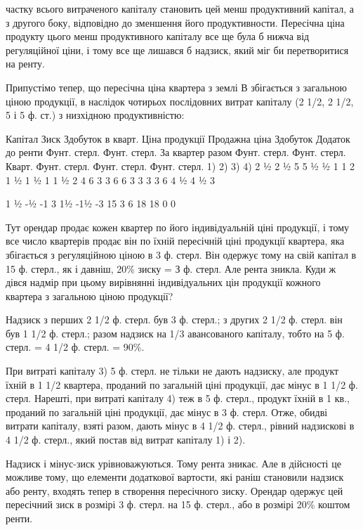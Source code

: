 \parcont{}  %
частку всього витраченого капіталу становить цей менш продуктивний капітал,
а з другого боку, відповідно до зменшення його продуктивности. Пересічна
ціна продукту цього менш продуктивного капіталу все ще була б нижча
від регуляційної ціни, і тому все ще лишався б надзиск, який міг би перетворитися
на ренту.

Припустімо тепер, що пересічна ціна квартера з землі В збігається з загальною
ціною продукції, в наслідок чотирьох послідовних витрат капіталу
(2  1/2, 2  1/2, 5 і 5 ф. ст.) з низхідною продуктивністю:

Капітал Зиск Здобуток в кварт. Ціна продукції Продажна ціна Здобуток Додаток до ренти
 Фунт. стерл. Фунт. стерл.  За квартер разом Фунт. стерл. Фунт. стерл. Кварт. Фунт. стерл.
    Фунт. стерл. Фунт. стерл.
1)
2)
3)
4) 2 ½
2 ½
5
5 ½
½
1
1 2
1 ½
1 ½
1
 1 ½
2
4
6 3
3
6
6 3
3
3
3 6
4 ½
4 ½
3

 1
½
-½
-1
 3
1½
-1½
-3
 15 3 6  18  18 0 0

Тут орендар продає кожен квартер по його індивідуальній ціні продукції,
і тому все число квартерів продає він по їхній пересічній ціні продукції квартера,
яка збігається з регуляційною ціною в 3 ф. стерл. Він одержує тому на свій
капітал в 15 ф. стерл., як і давніш, 20\% зиску = З ф. стерл. Але рента зникла.
Куди ж дівся надмір при цьому вирівнянні індивідуальних цін продукції кожного
квартера з загальною ціною продукції?

Надзиск з перших 2  1/2 ф. стерл. був 3 ф. стерл.; з других 2  1/2 ф. стерл.
він був 1 1/2 ф. стерл.; разом надзиск на  1/3 авансованого капіталу, тобто на
5 ф. стерл. = 4  1/2 ф. стерл. = 90\%.

При витраті капіталу 3) 5 ф. стерл. не тільки не дають надзиску, але
продукт їхній в 1 1/2 квартера, проданий по загальній ціні продукції, дає мінус в
1  1/2  ф. стерл. Нарешті, при витраті капіталу 4) теж в 5 ф. стерл., продукт
їхній в 1 кв., проданий по загальній ціні продукції, дає мінус в 3 ф. стерл. Отже,
обидві витрати капіталу, взяті разом, дають мінус в 4  1/2 ф. стерл., рівний надзискові
в 4  1/2  ф. стерл., який постав від витрат капіталу 1) і 2).

Надзиск і мінус-зиск урівноважуються. Тому рента зникає. Але в дійсності
це можливе тому, що елементи додаткової вартости, які раніш становили
надзиск або ренту, входять тепер в створення пересічного зиску. Орендар одержує
цей пересічний зиск в розмірі 3 ф. стерл. на 15 ф. стерл., або в розмірі
20\% коштом ренти.

